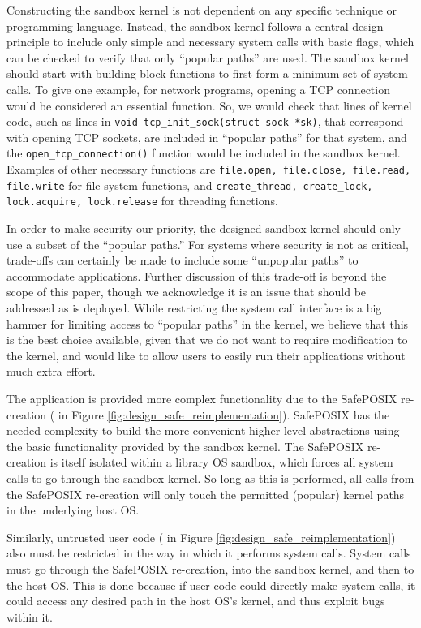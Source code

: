 Constructing the sandbox kernel is not dependent on any specific technique or programming language.
Instead, the sandbox kernel follows a central design principle to include only simple and necessary system calls with basic flags,
which can be checked to verify that only ``popular paths'' are used.
The sandbox kernel should start with building-block functions to first form a minimum set of system calls.
To give one example, for network programs, opening a TCP connection would be considered an essential function.
So, we would check that lines of kernel code, such as lines in \texttt{void tcp\_init\_sock(struct sock *sk)}, that correspond
with opening TCP sockets, are included in ``popular paths'' for that system, and the \texttt{open\_tcp\_connection()} function
would be included in the sandbox kernel.
Examples of other necessary functions are \texttt{file.open, file.close, file.read, file.write} for file system
functions, and \texttt{create\_thread, create\_lock, lock.acquire, lock.release} for threading functions.

In order to make security our priority, the designed sandbox kernel should only use a subset of the ``popular paths.''
For systems where security is not as critical, trade-offs can certainly be made to include some ``unpopular paths'' to accommodate applications.
Further discussion of this trade-off is beyond the scope of this paper,
though we acknowledge it is an issue that should be addressed as \lip is deployed.
While restricting the system call interface is a big hammer for limiting access to ``popular paths'' in the kernel,
we believe that this is the best choice available, given that we do not want to require modification to the kernel, and
would like to allow users to easily run their applications without much extra effort.

The application is provided more complex functionality due to the SafePOSIX re-creation
( in Figure \ref{fig:design_safe_reimplementation}).
SafePOSIX has the needed complexity to build the more convenient higher-level
abstractions using the basic functionality provided by the sandbox kernel.
The SafePOSIX re-creation is itself isolated within a library OS sandbox, which
forces all system calls to go through the sandbox kernel.
So long as this is performed, all calls from the SafePOSIX re-creation will only
touch the permitted (popular) kernel paths in the underlying host OS.

Similarly, untrusted user code ( in Figure \ref{fig:design_safe_reimplementation})
 also must be restricted in the way in which it performs system calls.
System calls must go through the SafePOSIX re-creation, into the sandbox kernel, and then to the host OS.
This is done because if user code could directly make system calls, it could
access any desired path in the host OS's kernel,
and thus exploit bugs within it.

